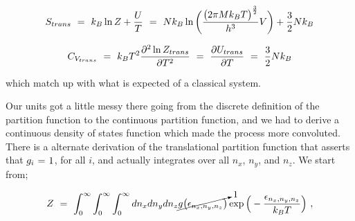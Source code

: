 \documentclass{article}
\newcounter{subsubsubsection}[subsubsection]
\begin{document}
\begin{equation} \label{eq:256}
S_{trans} \hspace{0.125cm} = \hspace{0.125cm} k_B \ln{Z} + \frac{U}{T} \hspace{0.125cm} = \hspace{0.125cm} N k_B \ln \bigg( \frac{\big( 2 \pi M k_B T \big)^{\frac{3}{2}}}{h^3} V \bigg)  + \frac{3}{2} N k_B
\end{equation}

\begin{equation} \label{eq:256}
C_{V_{trans}} \hspace{0.125cm} = \hspace{0.125cm} k_B T^2 \frac{\partial^2 \ln{Z_{trans}}}{\partial{T}^2} \hspace{0.125cm} = \hspace{0.125cm} \frac{\partial{U_{trans}}}{\partial{T}} \hspace{0.125cm} = \hspace{0.125cm} \frac{3}{2} N k_B 
\end{equation}

which match up with what is expected of a classical system.





Our units got a little messy there going from the discrete definition of the partition function to the continuous partition function, and we had to derive a continuous density of states function which made the process more convoluted. There is a alternate derivation of the translational partition function that asserts that \begin{math} g_i \hspace{0.025cm} = \hspace{0.025cm} 1 \end{math}, for all \begin{math} i \end{math}, and actually integrates over all \begin{math} n_x \end{math}, \begin{math} n_y \end{math}, and \begin{math} n_z \end{math}. We start from;

\begin{equation} \label{eq:256}
Z \hspace{0.125cm} = \hspace{0.125cm} \int_{0}^{\infty} \int_{0}^{\infty} \int_{0}^{\infty} d n_x d n_y d n_z \cancelto{1}{g \big( \epsilon_{n_x, n_y, n_z} \big)} \exp{\Big(-\frac{\epsilon_{n_x, n_y, n_z}}{k_B T} \Big)} \hspace{0.125cm} ,
\end{equation}
\end{document}
